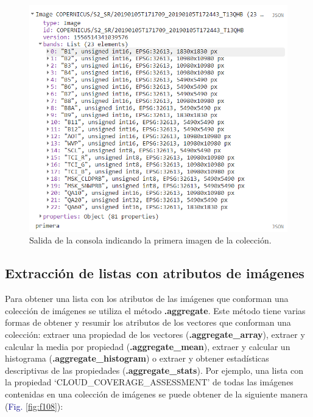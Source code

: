 \documentclass[
  12pt,
  letterpaper,
  twoside]{book}
\newcommand\boldpurple[1]{\textcolor{darkpurple}{\textbf{#1}}}
\begin{document}
\begin{figure}[H]

{\centering \includegraphics[width=0.8\linewidth]{Img/primerIm} 

}

\caption{Salida de la consola indicando la primera imagen de la colección.}\label{fig:f107}
\end{figure}

\hypertarget{extracciuxf3n-de-listas-con-atributos-de-imuxe1genes}{%
\subsection*{Extracción de listas con atributos de imágenes}\label{extracciuxf3n-de-listas-con-atributos-de-imuxe1genes}}

Para obtener una lista con los atributos de las imágenes que conforman una colección de imágenes se utiliza el método \boldpurple{.aggregate}. Este método tiene varias formas de obtener y resumir los atributos de los vectores que conforman una colección: extraer una propiedad de los vectores (\boldpurple{.aggregate\_array}), extraer y calcular la media por propiedad (\boldpurple{.aggregate}\boldpurple{\_mean}), extraer y calcular un histograma (\boldpurple{.aggregate\_histogram}) o extraer y obtener estadísticas descriptivas de las propiedades (\boldpurple{.aggregate\_stats}). Por ejemplo, una lista con la propiedad `CLOUD\_COVERAGE\_ASSESSMENT' de todas las imágenes contenidas en una colección de imágenes se puede obtener de la siguiente manera (\textcolor{darkblue}{Fig.} \ref{fig:f108}):
\end{document}
